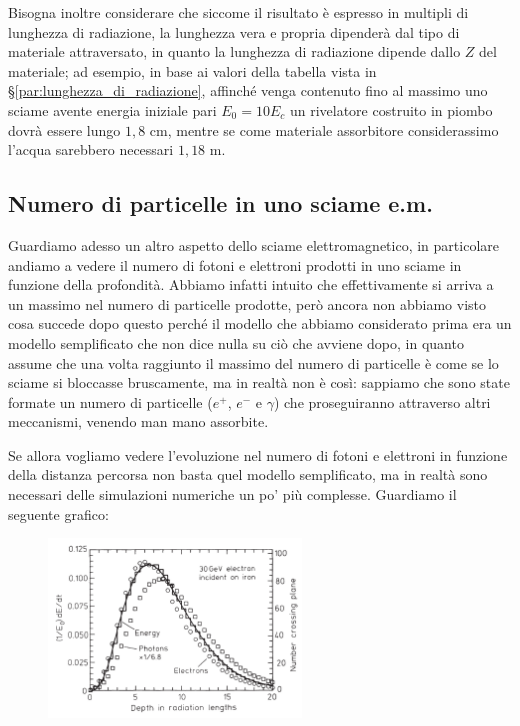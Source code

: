 
Bisogna inoltre considerare che siccome il risultato è espresso in multipli di lunghezza di radiazione, la lunghezza vera e propria dipenderà dal tipo di materiale attraversato, in quanto la lunghezza di radiazione dipende dallo $Z$ del materiale; ad esempio, in base ai valori della tabella vista in \S\ref{par:lunghezza_di_radiazione}, affinché venga contenuto fino al massimo uno sciame avente energia iniziale pari $E_0=10E_c$ un rivelatore costruito in piombo dovrà essere lungo $1,8$ cm, mentre se come materiale assorbitore considerassimo l'acqua sarebbero necessari $1,18$ m. %

\subsection{Numero di particelle in uno sciame e.m.}

Guardiamo adesso un altro aspetto dello sciame elettromagnetico, in particolare andiamo a vedere il numero di fotoni e elettroni prodotti in uno sciame in funzione della profondità. Abbiamo infatti intuito che effettivamente si arriva a un massimo nel numero di particelle prodotte, però ancora non abbiamo visto cosa succede dopo questo perché il modello che abbiamo considerato prima era un modello semplificato che non dice nulla su ciò che avviene dopo, in quanto assume che una volta raggiunto il massimo del numero di particelle è come se lo sciame si bloccasse bruscamente, ma in realtà non è così: sappiamo che sono state formate un numero di particelle ($e^+$, $e^-$ e $\gamma$) che proseguiranno attraverso altri meccanismi, venendo man mano assorbite.

Se allora vogliamo vedere l'evoluzione nel numero di fotoni e elettroni in funzione della distanza percorsa non basta quel modello semplificato, ma in realtà sono necessari delle simulazioni numeriche un po' più complesse. Guardiamo il seguente grafico:

\begin{figure}[H]
    \centering
    \includegraphics[width=0.6\textwidth]{immagini/numero_particelle_sciame_elettromagnetico.png}
\end{figure}

